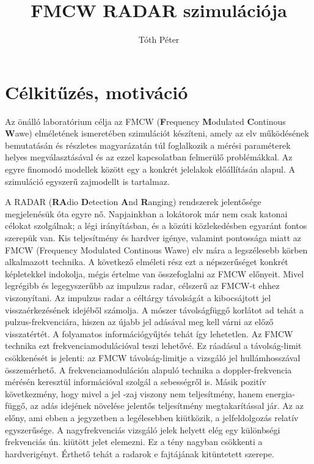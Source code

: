 \documentclass{article}
\begin{document}
\title{FMCW RADAR szimulációja}
\author{Tóth Péter}

\maketitle

\section{Célkitűzés, motiváció}

    \quad Az önálló laboratórium célja az FMCW (\textbf{F}requency \textbf{M}odulated \textbf{C}ontinous \textbf{W}awe)
    elméletének ismeretében szimulációt készíteni,
    amely az elv működésének bemutatásán és részletes magyarázatán túl foglalkozik a mérési paraméterek
    helyes megválasztásával és az ezzel kapcsolatban felmerülő problémákkal. Az egyre finomodó modellek között
    egy a konkrét jelelakok előállításán alapul. A szimuláció egyszerű zajmodellt is tartalmaz.

    \quad A RADAR (\textbf{RA}dio \textbf{D}etection \textbf{A}nd \textbf{R}anging) rendszerek jelentősége megjelenésük 
    óta egyre nő.  Napjainkban a lokátorok már nem csak katonai célokat szolgálnak; a légi irányításban, és a közúti 
    közlekedésben egyaránt fontos szerepük van.  Kis teljesítmény és hardver igénye, valamint pontossága miatt 
    az FMCW (Frequency Modulated Continous Wawe) elv mára a legszélesebb körben alkalmazott technika.  A következő 
    elméleti rész ezt a népszerűséget konkrét képletekkel indokolja, mégis értelme van összefoglalni az FMCW előnyeit.
    Mivel legrégibb és legegyszerűbb az impulzus radar, célszerű az FMCW-t ehhez viszonyítani. Az impulzus radar 
    a céltárgy távolságát a kibocsájtott jel visszaérkezésének idejéből számolja. A mószer távolságfüggő korlátot 
    ad tehát a pulzus-frekvenciára, hiszen az újabb jel adásával meg kell várni az előző visszatértét.  A folyamatos 
    információgyűjtés tehát így lehetetlen. Az FMCW technika ezt frekvenciamodulációval teszi lehetővé.
    Ez ráadásul a távolság-limit csökkenését is jelenti: az FMCW távolság-limitje a vizsgáló jel hullámhosszával összemérhető.
    A frekvenciamoduláción alapuló technika
    a doppler-frekvencia mérésén keresztül információval szolgál a sebességről is. Másik pozitív következmény, hogy 
    mivel a jel -zaj viszony nem teljesítmény, hanem energia-függő, az adás idejének növelése jelentős teljesítmény
    megtakarítással jár. Az az előny, ami ebben a jegyzetben a legélesebben kiütközik, a jelfeldolgozás relatív
    egyszerűsége. A nagyfrekvenciás vizsgáló jelek helyett elég egy különbségi frekvenciás ún. kiütött jelet elemezni.
    Ez a tény nagyban csökkenti a hardverigényt. Érthető tehát a radarok e fajtájának kitüntetett szerepe.
\end{document}
